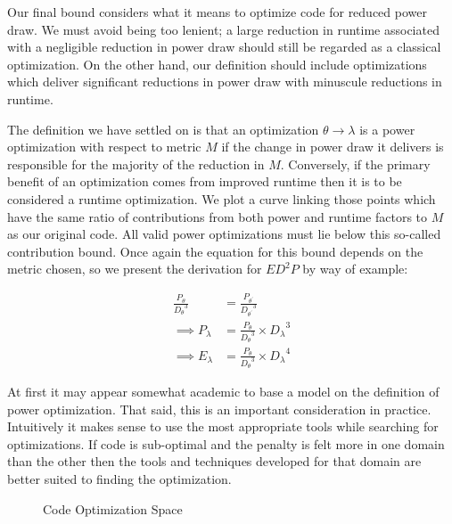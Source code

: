 Our final bound considers what it means to optimize code for reduced power draw. We must avoid being too lenient; a large reduction in runtime associated with a negligible reduction in power draw should still be regarded as a classical optimization. On the other hand, our definition should include optimizations which deliver significant reductions in power draw with minuscule reductions in runtime. 

The definition we have settled on is that an optimization $\theta \to \lambda$ is a power optimization with respect to metric $M$ if the change in power draw it delivers is responsible for the majority of the reduction in $M$. Conversely, if the primary benefit of an optimization comes from improved runtime then it is to be considered a runtime optimization. We plot a curve linking those points which have the same ratio of contributions from both power and runtime factors to $M$ as our original code. All valid power optimizations must lie below this so-called contribution bound. Once again the equation for this bound depends on the metric chosen, so we present the derivation for $ED^{2}P$ by way of example:

\begin{align}
\frac{P_{\theta}}{{D_{\theta}}^3} &= \frac{P_{\theta^\prime}}{{D_{\theta^\prime}}^3}\\ 
\implies P_{\lambda} &= \frac{P_{\theta}}{{D_{\theta}}^3} \times {D_{\lambda}}^3 \nonumber \\
\implies E_{\lambda} &= \frac{P_{\theta}}{{D_{\theta}}^3} \times {D_{\lambda}}^4
\end{align}


At first it may appear somewhat academic to base a model on the definition of power optimization. That said, this is an important consideration in practice. Intuitively it makes sense to use the most appropriate tools while searching for optimizations. If code is sub-optimal and the penalty is felt more in one domain than the other then the tools and techniques developed for that domain are better suited to finding the optimization.


\begin{figure}

\caption{Code Optimization Space}\label{fig:modeldraw}
\end{figure}


